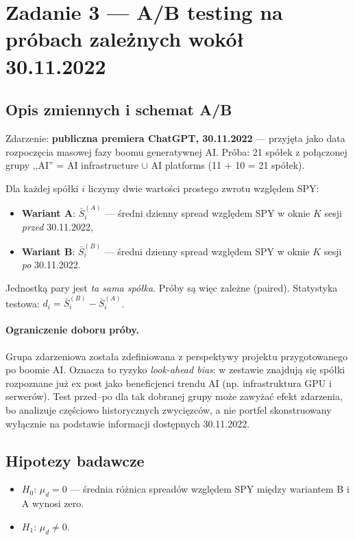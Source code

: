 \documentclass[11pt,a4paper]{article}
\begin{document}
\clearpage
\section{Zadanie 3 --- A/B testing na próbach zależnych wokół 30.11.2022}

\subsection{Opis zmiennych i schemat A/B}
Zdarzenie: \textbf{publiczna premiera ChatGPT, 30.11.2022} --- przyjęta jako data
rozpoczęcia masowej fazy boomu generatywnej AI. Próba: 21 spółek z połączonej
grupy ,,AI'' = AI infrastructure $\cup$ AI platforms (11 + 10 = 21 spółek).

Dla każdej spółki $i$ liczymy dwie wartości prostego zwrotu względem SPY:
\begin{itemize}
  \item \textbf{Wariant A}: $\bar S_i^{(A)}$ --- średni dzienny spread względem
        SPY w oknie $K$ sesji \emph{przed} 30.11.2022,
  \item \textbf{Wariant B}: $\bar S_i^{(B)}$ --- średni dzienny spread względem SPY
        w oknie $K$ sesji \emph{po} 30.11.2022.
\end{itemize}
Jednostką pary jest \emph{ta sama spółka}. Próby są więc zależne (paired).
Statystyka testowa: $d_i = \bar S_i^{(B)} - \bar S_i^{(A)}$.

\paragraph{Ograniczenie doboru próby.}
Grupa zdarzeniowa została zdefiniowana z perspektywy projektu przygotowanego
po boomie AI. Oznacza to ryzyko \emph{look-ahead bias}: w zestawie znajdują się
spółki rozpoznane już ex post jako beneficjenci trendu AI (np. infrastruktura
GPU i serwerów). Test przed--po dla tak dobranej grupy może zawyżać efekt
zdarzenia, bo analizuje częściowo historycznych zwycięzców, a nie portfel
skonstruowany wyłącznie na podstawie informacji dostępnych 30.11.2022.

\subsection{Hipotezy badawcze}
\begin{itemize}
  \item $H_0$: $\mu_d = 0$ --- średnia różnica spreadów względem SPY między
        wariantem B i A wynosi zero.
  \item $H_1$: $\mu_d \neq 0$.
\end{itemize}
\end{document}
